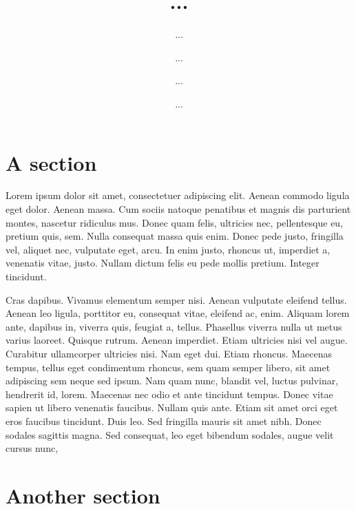 \documentclass[USenglish]{article}
\begin{document}

  \author*[1]{...}
  \author[2]{...}
  \author[1]{...} 
  \title{...}
  \subtitle{...}
  \dedication{...}
  \aop

\maketitle

\section{A section} 

Lorem ipsum dolor sit amet, consectetuer adipiscing elit. Aenean commodo ligula eget dolor. Aenean
  massa. Cum sociis natoque penatibus et magnis dis parturient montes, nascetur ridiculus mus. Donec
  quam felis, ultricies nec, pellentesque eu, pretium quis, sem. Nulla consequat massa quis
  enim. Donec pede justo, fringilla vel, aliquet nec, vulputate eget, arcu. In enim justo, rhoncus
  ut, imperdiet a, venenatis vitae, justo. Nullam dictum felis eu pede mollis pretium. Integer
  tincidunt.

  Cras dapibus. Vivamus elementum semper nisi. Aenean vulputate eleifend tellus. Aenean
  leo ligula, porttitor eu, consequat vitae, eleifend ac, enim. Aliquam lorem ante, dapibus in,
  viverra quis, feugiat a, tellus. Phasellus viverra nulla ut metus varius laoreet. Quisque
  rutrum. Aenean imperdiet. Etiam ultricies nisi vel augue. Curabitur ullamcorper ultricies
  nisi. Nam eget dui. Etiam rhoncus. Maecenas tempus, tellus eget condimentum rhoncus, sem quam
  semper libero, sit amet adipiscing sem neque sed ipsum. Nam quam nunc, blandit vel, luctus
  pulvinar, hendrerit id, lorem. Maecenas nec odio et ante tincidunt tempus. Donec vitae sapien ut
  libero venenatis faucibus. Nullam quis ante. Etiam sit amet orci eget eros faucibus
  tincidunt. Duis leo. Sed fringilla mauris sit amet nibh. Donec sodales sagittis magna. Sed
  consequat, leo eget bibendum sodales, augue velit cursus nunc,

\section{Another section} 
\end{document}
